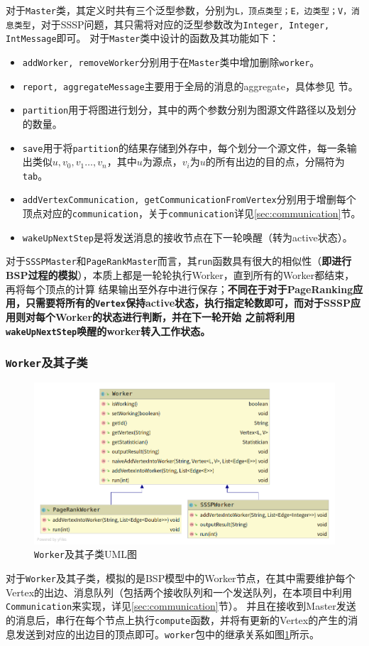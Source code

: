 \documentclass{ML}
\begin{document}
对于\texttt{Master}类，其定义时共有三个泛型参数，分别为\texttt{L，顶点类型；E，边类型；V，消息类型}，对于SSSP问题，其只需将对应的泛型参数改为\texttt{Integer, Integer, IntMessage}即可。
对于\texttt{Master}类中设计的函数及其功能如下：
\begin{itemize}
    \item \texttt{addWorker, removeWorker}分别用于在\texttt{Master}类中增加删除\texttt{worker}。
    \item \texttt{report, aggregateMessage}主要用于全局的消息的aggregate，具体参见 节。%
    \item \texttt{partition}用于将图进行划分，其中的两个参数分别为图源文件路径以及划分的数量。
    \item \texttt{save}用于将\texttt{partition}的结果存储到外存中，每个划分一个源文件，每一条输出类似$u,v_0,v_1\dots,v_n$，其中$u$为源点，$v_i$为$u$的所有出边的目的点，分隔符为\texttt{tab}。
    \item \texttt{addVertexCommunication, getCommunicationFromVertex}分别用于增删每个顶点对应的\texttt{communication}，关于\texttt{communication}详见\ref{sec:communication}节。
    \item \texttt{wakeUpNextStep}是将发送消息的接收节点在下一轮唤醒（转为active状态）。
\end{itemize}

对于\texttt{SSSPMaster}和\texttt{PageRankMaster}而言，其\texttt{run}函数具有很大的相似性（\textbf{即进行BSP过程的模拟}），本质上都是一轮轮执行Worker，直到所有的Worker都结束，再将每个顶点的计算
结果输出至外存中进行保存；\textbf{不同在于对于PageRanking应用，只需要将所有的\texttt{Vertex}保持active状态，执行指定轮数即可，而对于SSSP应用则对每个Worker的状态进行判断，并在下一轮开始
之前将利用\texttt{wakeUpNextStep}唤醒的worker转入工作状态。}

\subsubsection{\texttt{Worker}及其子类}\label{sec:worker}
\begin{figure}[htb]
    \centering
    \includegraphics[width=0.7\linewidth]{media/worker.png}
    \caption{\texttt{Worker}及其子类UML图}\label{fig:worker}
\end{figure}
对于\texttt{Worker}及其子类，模拟的是BSP模型中的Worker节点，在其中需要维护每个Vertex的出边、消息队列（包括两个接收队列和一个发送队列，在本项目中利用\texttt{Communication}来实现，详见\ref{sec:communication}节）。
并且在接收到Master发送的消息后，串行在每个节点上执行\texttt{compute}函数，并将有更新的Vertex的产生的消息发送到对应的出边目的顶点即可。\texttt{worker}包中的继承关系如图\ref{fig:worker}所示。
\end{document}
